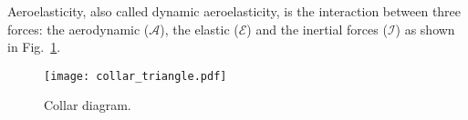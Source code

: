 
Aeroelasticity, also called dynamic aeroelasticity,
is the interaction between three forces:
the aerodynamic ($\mathcal{A}$), the elastic ($\mathcal{E}$) and
the inertial forces ($\mathcal{I}$) as 
shown in Fig.~\ref{fig:ael_collar_triangle}. 
\begin{figure}[htb]
  \centering
  \texttt{[image: collar\_triangle.pdf]}
  \caption{Collar diagram.}
  \label{fig:ael_collar_triangle}
\end{figure} 
